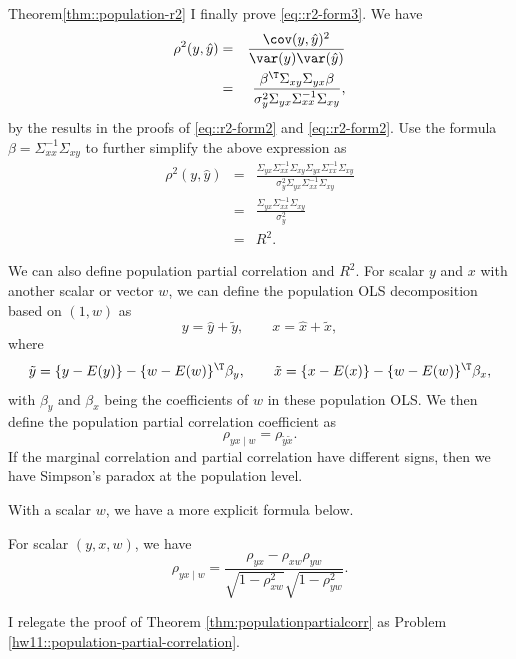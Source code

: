 \begin{myproof}{Theorem}{\ref{thm::population-r2}}
I finally prove \eqref{eq::r2-form3}. We have
\begin{eqnarray*}
\rho^{2}(y,\hat{y}) &=&
\frac{ \cov(y, \hat{y})^2 }{ \var(y) \var(\hat{y}) } \\
&=& \frac{ \beta^{\T} \Sigma_{xy} \Sigma_{yx} \beta  }{  \sigma_y^2 \Sigma_{yx}\Sigma_{xx}^{-1}\Sigma_{xy} },
\end{eqnarray*}
by the results in the proofs of \eqref{eq::r2-form2} and \eqref{eq::r2-form2}. Use the formula $\beta = \Sigma_{xx}^{-1}\Sigma_{xy}$ to further simplify the above expression as
\begin{eqnarray*}
\rho^{2}(y,\hat{y}) &=&
\frac{ \Sigma_{yx}\Sigma_{xx}^{-1} \Sigma_{xy} \Sigma_{yx} \Sigma_{xx}^{-1}\Sigma_{xy}  }{  \sigma_y^2 \Sigma_{yx}\Sigma_{xx}^{-1}\Sigma_{xy} } \\
&=& \frac{ \Sigma_{yx}\Sigma_{xx}^{-1} \Sigma_{xy}   }{  \sigma_y^2  }  \\
&=& R^2.
\end{eqnarray*}
\end{myproof}



We can also define population partial correlation and $R^{2}.$ For
scalar $y$ and $x$ with another scalar or vector $w$, we can define
the population OLS decomposition based on $(1,w)$ as
\begin{equation}
\label{eq::population-ols-decomposition}
y=\hat{y}+\tilde{y},\qquad x=\hat{x}+\tilde{x},
\end{equation} 
where 
$$ 
 \tilde{y} =  \{ y- E(y) \} - \{ w - E(w) \}^{\T}\beta_{y},\qquad 
 \tilde{x} =  \{ x- E(x) \} - \{  w-E(w) \} ^{\T}\beta_{x} ,
 $$ 
 with $\beta_{y}$ and $\beta_{x}$ being the coefficients of $w$ in these population OLS. 
We then define the population partial correlation coefficient as
\[
\rho_{yx\mid w}=\rho_{\tilde{y}\tilde{x}}.
\]
If the marginal correlation and partial correlation have different signs, then we have Simpson's paradox at the population level. 


With a scalar $w$, we have a more explicit formula below.
\begin{theorem}
\label{thm:populationpartialcorr}For scalar $(y,x,w)$, we have
\[
\rho_{yx\mid w}=\frac{\rho_{yx}-\rho_{xw}\rho_{yw}}{\sqrt{1-\rho_{xw}^{2}}\sqrt{1-\rho_{yw}^{2}}}.
\]
\end{theorem}


I relegate the proof of Theorem \ref{thm:populationpartialcorr} as  Problem \ref{hw11::population-partial-correlation}.


